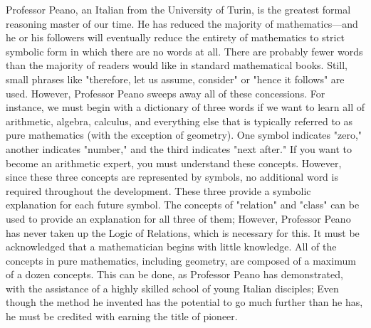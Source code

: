 \documentclass[a4paper,12pt]{book}[2004/02/16]
\theoremstyle{ilemma}
\theoremstyle{itheorem}
\theoremstyle{iother}
\theoremstyle{icorollary}
\theoremstyle{numcorollary}
\theoremstyle{idefinition}
\begin{document}
Professor Peano, an Italian from the University of Turin, is the greatest formal reasoning master of our time. He has reduced the majority of mathematics—and he or his followers will eventually reduce the entirety of mathematics to strict symbolic form in which there are no words at all. There are probably fewer words than the majority of readers would like in standard mathematical books. Still, small phrases like "therefore, let us assume, consider" or "hence it follows" are used. However, Professor Peano sweeps away all of these concessions. For instance, we must begin with a dictionary of three words if we want to learn all of arithmetic, algebra, calculus, and everything else that is typically referred to as pure mathematics (with the exception of geometry). One symbol indicates "zero," another indicates "number," and the third indicates "next after." If you want to become an arithmetic expert, you must understand these concepts. However, since these three concepts are represented by symbols, no additional word is required throughout the development. These three provide a symbolic explanation for each future symbol.
The concepts of "relation" and "class" can be used to provide an explanation for all three of them; However, Professor Peano has never taken up the Logic of Relations, which is necessary for this. It must be acknowledged that a mathematician begins with little knowledge. All of the concepts in pure mathematics, including geometry, are composed of a maximum of a dozen concepts. This can be done, as Professor Peano has demonstrated, with the assistance of a highly skilled school of young Italian disciples; Even though the method he invented has the potential to go much further than he has, he must be credited with earning the title of pioneer.
\end{document}
